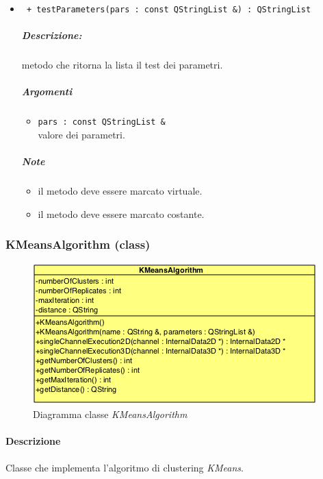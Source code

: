 \begin{itemize}
		\item \color{blue}\verb! + testParameters(pars : const QStringList &) : QStringList!
		\color{black}
		\subparagraph{Descrizione:} metodo che ritorna la lista il test dei parametri.
		\subparagraph{Argomenti}
			\begin{itemize}
				\item \color{RoyalPurple} \verb!pars : const QStringList & ! \\ 
				\color{black} valore dei parametri.	
			\end{itemize}
		\subparagraph{Note}
			\begin{itemize}
				\item il metodo deve essere marcato virtuale.
				\item il metodo deve essere marcato costante.
			\end{itemize}				
			
	\end{itemize}
\pagebreak
\color{black}
\subsubsection{KMeansAlgorithm (class)}
\label{KMeanslAlgorithm}
\begin{figure}[!h]
\centering
			\includegraphics[scale=1]{./Content/Immagini/modelCore/KMeansAlgorithm.png}
			\caption{Diagramma classe \textsl{KMeansAlgorithm}}
			\label{KMeansAlgorithm_img}
\end{figure}

\paragraph{Descrizione \\} Classe che implementa l'algoritmo di clustering\g{} \textit{KMeans}.

